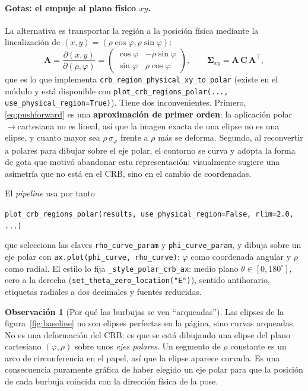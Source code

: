 \documentclass[11pt,a4paper]{article}
\newcommand{\matr}[1]{\mathbf{#1}}
\newcommand{\code}[1]{\texttt{#1}}
\theoremstyle{definition}
\newtheorem{obs}{Observación}
\theoremstyle{plain}
\begin{document}
\paragraph{Gotas: el empuje al plano físico $xy$.}
La alternativa es transportar la región a la posición física mediante la
linealización de $(x,y)=(\rho\cos\varphi,\rho\sin\varphi)$:
%
\begin{equation}
\label{eq:pushforward}
\matr A = \frac{\partial(x,y)}{\partial(\rho,\varphi)}
= \begin{pmatrix}\cos\varphi & -\rho\sin\varphi\\
                 \sin\varphi & \rho\cos\varphi\end{pmatrix},
\qquad
\matr\Sigma_{xy} = \matr A\,\matr C\,\matr A^\top ,
\end{equation}
%
que es lo que implementa \code{crb\_region\_physical\_xy\_to\_polar} (existe en
el módulo y está disponible con
\code{plot\_crb\_regions\_polar(..., use\_physical\_region=True)}). Tiene dos
inconvenientes. Primero, \eqref{eq:pushforward} es una \textbf{aproximación de
primer orden}: la aplicación polar$\to$cartesiana no es lineal, así que la
imagen exacta de una elipse no es una elipse, y cuanto mayor sea
$\rho\,\sigma_\varphi$ frente a $\rho$ más se deforma. Segundo, al reconvertir a
polares para dibujar sobre el eje polar, el contorno se curva y adopta la forma
de gota que motivó abandonar esta representación: visualmente sugiere una
asimetría que no está en el CRB, sino en el cambio de coordenadas.

El \emph{pipeline} usa por tanto
%
\begin{center}
\code{plot\_crb\_regions\_polar(results, use\_physical\_region=False, rlim=2.0, ...)}
\end{center}
%
que selecciona las claves \code{rho\_curve\_param} y \code{phi\_curve\_param}, y
dibuja sobre un eje polar con \code{ax.plot(phi\_curve, rho\_curve)}: $\varphi$
como coordenada angular y $\rho$ como radial. El estilo lo fija
\code{\_style\_polar\_crb\_ax}: medio plano $\theta\in[0,180^\circ]$, cero a la
derecha (\code{set\_theta\_zero\_location("E")}), sentido antihorario,
etiquetas radiales a dos decimales y fuentes reducidas.

\begin{obs}[Por qué las burbujas se ven \enquote{arqueadas}]
Las elipses de la figura~\ref{fig:baseline} no son elipses perfectas en la
página, sino curvas arqueadas. No es una deformación del CRB: es que se está
dibujando una elipse del plano cartesiano $(\varphi,\rho)$ sobre unos
\emph{ejes polares}. Un segmento de $\rho$ constante es un arco de
circunferencia en el papel, así que la elipse aparece curvada. Es una
consecuencia puramente gráfica de haber elegido un eje polar para que la
posición de cada burbuja coincida con la dirección física de la pose.
\end{obs}
\end{document}
